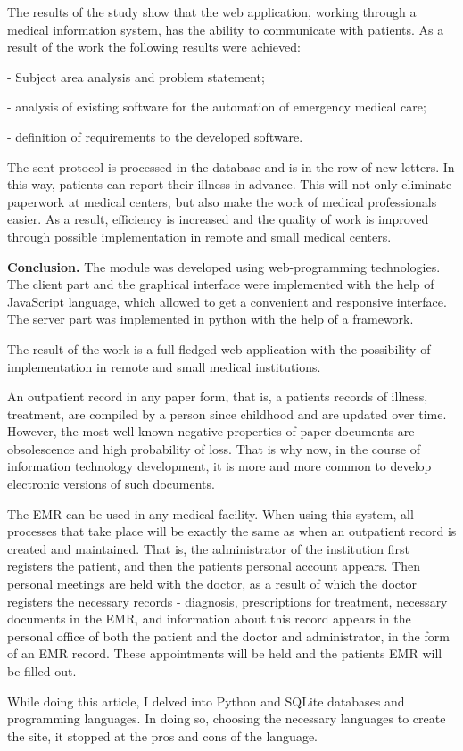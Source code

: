 \begin{multicols}{2}

The results of the study show that the web application, working through
a medical information system, has the ability to communicate with
patients. As a result of the work the following results were achieved:

- Subject area analysis and problem statement;

- analysis of existing software for the automation of emergency medical
care;

- definition of requirements to the developed software.

The sent protocol is processed in the database and is in the row of new
letters. In this way, patients can report their illness in advance. This
will not only eliminate paperwork at medical centers, but also make the
work of medical professionals easier. As a result, efficiency is
increased and the quality of work is improved through possible
implementation in remote and small medical centers.

{\bfseries Conclusion.} The module was developed using web-programming
technologies. The client part and the graphical interface were
implemented with the help of JavaScript language, which allowed to get a
convenient and responsive interface. The server part was implemented in
python with the help of a framework.

The result of the work is a full-fledged web application with the
possibility of implementation in remote and small medical institutions.

An outpatient record in any paper form, that is, a
patient\textquotesingle s records of illness, treatment, are compiled by
a person since childhood and are updated over time. However, the most
well-known negative properties of paper documents are obsolescence and
high probability of loss. That is why now, in the course of information
technology development, it is more and more common to develop electronic
versions of such documents.

The EMR can be used in any medical facility. When using this system, all
processes that take place will be exactly the same as when an outpatient
record is created and maintained. That is, the administrator of the
institution first registers the patient, and then the
patient\textquotesingle s personal account appears. Then personal
meetings are held with the doctor, as a result of which the doctor
registers the necessary records - diagnosis, prescriptions for
treatment, necessary documents in the EMR, and information about this
record appears in the personal office of both the patient and the doctor
and administrator, in the form of an EMR record. These appointments will
be held and the patient\textquotesingle s EMR will be filled out.

While doing this article, I delved into Python and SQLite databases and
programming languages. In doing so, choosing the necessary languages to
create the site, it stopped at the pros and cons of the language.
\end{multicols}

